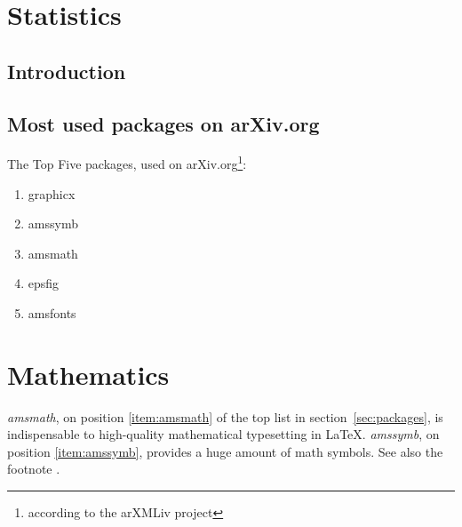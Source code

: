 \documentclass{book}
\begin{document}
\chapter{Statistics}
\section{Introduction}
\newpage
\section{Most used packages on arXiv.org}\label{sec:packages}
The Top Five packages, used on arXiv.org\footnote{according
to the arXMLiv project\label{fn:project}}:
\begin{enumerate}
  \item graphicx
  \item amssymb \label{item:amssymb}
  \item amsmath \label{item:amsmath}
  \item epsfig
  \item amsfonts
\end{enumerate}
\chapter{Mathematics}
\emph{amsmath}, on position \ref{item:amsmath} of the top list
in section~\vref{sec:packages}, is indispensable to high-quality
mathematical typesetting in \LaTeX. \emph{amssymb}, on position
\ref{item:amssymb}, provides a huge amount of math symbols.
See also the footnote .
\end{document}
